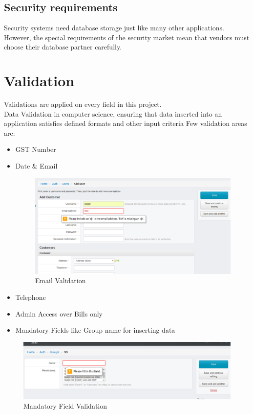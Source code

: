 \subsection{Security requirements}
Security systems need database storage just like many other applications. However, the special requirements of the security market mean that vendors must choose their database partner carefully.



\section{Validation}
Validations are applied on every field in this project.\\
Data Validation in computer science, ensuring that data inserted into an application satisfies defined formats and other input criteria
Few validation areas are:
\begin{itemize}
\item GST Number
\item Date \& Email
\begin{figure}[!ht]
	\centering
	\includegraphics[scale=0.45]{input/images/emailvalid.png}                
	\caption{Email Validation}
	\hspace{-1.5em}
\end{figure}
\item Telephone
\item Admin Access over Bills only
\item Mandatory Fields like Group name for inserting data
\end{itemize}
\begin{figure}[!ht]
	\centering
	\includegraphics[scale=0.45]{input/images/groupvalid.png}                
	\caption{Mandatory Field Validation}
	\hspace{-1.5em}
\end{figure}

